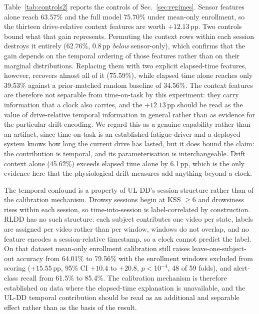 \documentclass[journal]{IEEEtran}
\newcommand{\pp}{\,pp}
\begin{document}
Table~\ref{tab:controls2} reports the controls of Sec.~\ref{sec:regimes}.
Sensor features alone reach 63.57\% and the full model 75.70\% under mean-only
enrollment, so the thirteen drive-relative context features are worth
$+12.13$\pp{}. Two controls bound what that gain represents. Permuting the
context rows within each session destroys it entirely (62.76\%, 0.8\pp{}
\emph{below} sensor-only), which confirms that the gain depends on the temporal
ordering of those features rather than on their marginal distributions.
Replacing them with two explicit elapsed-time features, however, recovers almost
all of it (75.59\%), while elapsed time alone reaches only 39.53\% against a
prior-matched random baseline of 34.56\%. The context features are therefore not
separable from time-on-task by this experiment: they carry information that a
clock also carries, and the $+12.13$\pp{} should be read as the value of
drive-relative temporal information in general rather than as evidence for the
particular drift encoding. We regard this as a genuine capability rather than an
artifact, since time-on-task is an established fatigue driver and a deployed
system knows how long the current drive has lasted, but it does bound the claim:
the contribution is temporal, and its parameterisation is interchangeable. Drift
context alone (45.62\%) exceeds elapsed time alone by 6.1\pp{}, which is the
only evidence here that the physiological drift measures add anything beyond a
clock.

The temporal confound is a property of UL-DD's session structure rather than of
the calibration mechanism. Drowsy sessions begin at KSS $\ge 6$ and drowsiness
rises within each session, so time-into-session is label-correlated by
construction. RLDD has no such structure: each subject contributes one video per
state, labels are assigned per video rather than per window, windows do not
overlap, and no feature encodes a session-relative timestamp, so a clock cannot
predict the label. On that dataset mean-only enrollment calibration still raises
leave-one-subject-out accuracy from 64.01\% to 79.56\% with the enrollment
windows excluded from scoring ($+15.55$\pp{}, 95\% CI $+10.4$ to $+20.8$,
$p < 10^{-4}$, 48 of 59 folds), and alert-class recall from 61.5\% to 85.4\%.
The calibration mechanism is therefore established on data where the elapsed-time
explanation is unavailable, and the UL-DD temporal contribution should be read as
an additional and separable effect rather than as the basis of the result.
\end{document}
